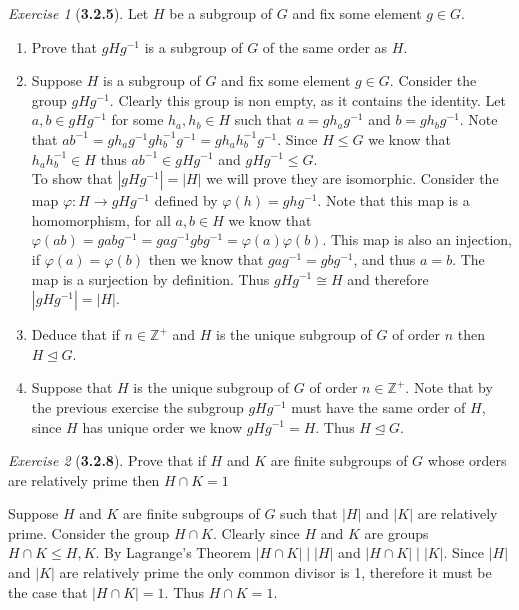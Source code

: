 \documentclass[12pt]{amsart}
\makeatletter
\theoremstyle{remark}
\newtheorem*{exercise}{Exercise}%
\def\ZZ{\ensuremath{\mathbb Z}}
\renewenvironment{proof}[1][\proofname]{\par\doublespacing
  \pushQED{\qed}%
  \normalfont \topsep6\p@\@plus6\p@\relax
  \list{}{%
    \settowidth{\leftmargin}{\itshape\proofname:\hskip\labelsep}%
    \setlength{\labelwidth}{0pt}%
    \setlength{\itemindent}{-\leftmargin}%
  }%
  \item[\hskip\labelsep\itshape#1\@addpunct{:}]\ignorespaces
}{%
  \popQED\endlist\@endpefalse
  \singlespacing
}
\theoremstyle{mycomment}
\makeatother
\begin{document}
\begin{exercise}[\textbf{3.2.5}] Let $H$ be a subgroup of $G$ and fix some element $g \in G$.
  \begin{enumerate}
    \item[a] Prove that $gHg^{-1}$ is a subgroup of $G$ of the same order as $H$.\\
    \begin{proof} Suppose $H$ is a subgroup of $G$ and fix some element $g \in G$. Consider the group $gHg^{-1}$. Clearly this 
      group is non empty, as it contains the identity. Let $a, b \in gHg^{-1}$ for some $h_a, h_b \in H$ such that $a = gh_ag^{-1}$ and 
      $b = gh_bg^{-1}$. Note that $ab^{-1} = gh_ag^{-1}gh_b^{-1}g^{-1} = gh_ah_b^{-1}g^{-1}$. Since $H \leq G$ we know that $h_ah_b^{-1} \in H$ thus 
      $ab^{-1} \in gHg^{-1}$ and $gHg^{-1} \leq G$.\\
      To show that $|gHg^{-1}| = |H|$ we will prove they are isomorphic. Consider the map $\varphi: H \to gHg^{-1}$ defined by $\varphi(h) = ghg^{-1}$.
      Note that this map is a homomorphism, for all $a, b \in H$ we know that $\varphi(ab) = gabg^{-1} = gag^{-1}gbg^{-1} = \varphi(a)\varphi(b)$. This map is also an injection, if $\varphi(a) = \varphi(b)$ then we know that $gag^{-1} = gbg^{-1}$, and thus $a = b$. The map is a surjection by definition. Thus $gHg^{-1} \cong H$ and therefore $|gHg^{-1}| = |H|$.
    \end{proof}
    \vspace{.15in}
    \item[b] Deduce that if $n \in \ZZ^+$ and $H$ is the unique subgroup of $G$ of order $n$ then $H \trianglelefteq G$.\\
    \begin{proof} Suppose that $H$ is the unique subgroup of $G$ of order $n \in \ZZ^+$. Note that by the previous exercise the 
      subgroup $gHg^{-1}$ must have the same order of $H$, since $H$ has unique order we know $gHg^{-1} = H$. Thus  $H \trianglelefteq G$.
    \end{proof} 
  \end{enumerate}
\end{exercise}
\vspace{.15in}



\begin{exercise}[\textbf{3.2.8}]Prove that if $H$ and $K$ are finite subgroups of $G$ whose orders are relatively prime then $H \cap K = 1$
    \begin{proof} Suppose $H$ and $K$ are finite subgroups of $G$ such that $|H|$ and $|K|$ are relatively prime.
      Consider the group $H \cap K$. Clearly since $H$ and $K$ are groups $H \cap K \leq H, K$. By Lagrange's Theorem $|H \cap K| \mid |H|$ and  
      $|H \cap K| \mid |K|$. Since $|H|$ and $|K|$ are relatively prime the only common divisor is 1, therefore it must be the case that $|H \cap K| = 1$. Thus $H \cap K = 1$. 
      \end{proof}
\end{exercise}
\vspace{.15in}
\end{document}

